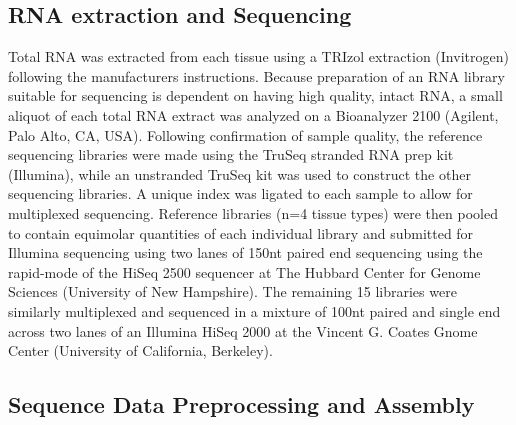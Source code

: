 \documentclass[11pt]{article}
\begin{document}
\subsection*{RNA extraction and Sequencing}

Total RNA was extracted from each tissue using a TRIzol extraction (Invitrogen) following the manufacturers instructions. Because preparation of an RNA library suitable for sequencing is dependent on having high
quality, intact RNA, a small aliquot of each total RNA extract was
analyzed on a Bioanalyzer 2100 (Agilent, Palo Alto, CA, USA).
Following confirmation of sample quality, the reference sequencing libraries
were made using the TruSeq stranded RNA prep kit
(Illumina), while an unstranded TruSeq kit was used to construct the other sequencing libraries. A unique index was ligated to each sample to allow for multiplexed sequencing. Reference libraries (n=4 tissue types) were then pooled to
contain equimolar quantities of each individual library and
submitted for Illumina sequencing using two lanes of 150nt paired end sequencing using the rapid-mode of the HiSeq 2500 sequencer at The Hubbard Center for Genome Sciences (University of New Hampshire). The remaining 15 libraries were similarly multiplexed and sequenced in a mixture of 100nt paired and single end across two lanes of an Illumina HiSeq 2000 at the Vincent G. Coates Gnome Center (University of California, Berkeley).

\subsection*{Sequence Data Preprocessing and Assembly}
\end{document}
